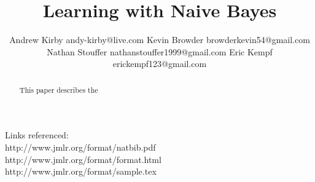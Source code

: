 \documentclass[twoside,11pt]{article}
\begin{document}
\title{Learning with Naive Bayes}

\author{\name Andrew Kirby \email andy-kirby@live.com \AND
		\name Kevin Browder \email browderkevin54@gmail.com \AND
		\name Nathan Stouffer \email nathanstouffer1999@gmail.com \AND
		\name Eric Kempf \email erickempf123@gmail.com }

\editor{}

	
\maketitle

\begin{abstract}
	This paper describes the 
\end{abstract}

\begin{keywords}
\end{keywords}

Links referenced: \\
http://www.jmlr.org/format/natbib.pdf \\
http://www.jmlr.org/format/format.html \\
http://www.jmlr.org/format/sample.tex \\


\end{document}
